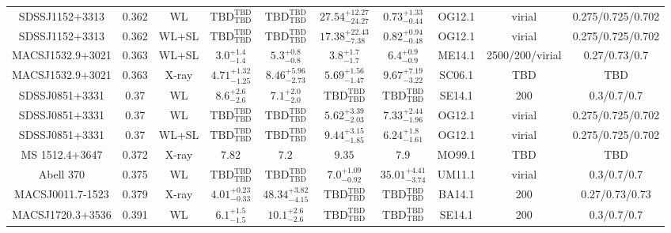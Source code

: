 \begin{table}
\begin{tabular}{cccccccccc}
SDSSJ1152+3313 & 0.362 & WL & ${\mathrm{TBD}}^{\mathrm{TBD}}_{\mathrm{TBD}}$ & ${\mathrm{TBD}}^{\mathrm{TBD}}_{\mathrm{TBD}}$ & ${27.54}^{+12.27}_{-24.27}$ & ${0.73}^{+1.33}_{-0.44}$ & OG12.1 & virial & 0.275/0.725/0.702 \\
SDSSJ1152+3313 & 0.362 & WL+SL & ${\mathrm{TBD}}^{\mathrm{TBD}}_{\mathrm{TBD}}$ & ${\mathrm{TBD}}^{\mathrm{TBD}}_{\mathrm{TBD}}$ & ${17.38}^{+22.43}_{-7.38}$ & ${0.82}^{+0.94}_{-0.48}$ & OG12.1 & virial & 0.275/0.725/0.702 \\
MACSJ1532.9+3021 & 0.363 & WL+SL & ${3.0}^{+1.4}_{-1.4}$ & ${5.3}^{+0.8}_{-0.8}$ & ${3.8}^{+1.7}_{-1.7}$ & ${6.4}^{+0.9}_{-0.9}$ & ME14.1 & 2500/200/virial & 0.27/0.73/0.7 \\
MACSJ1532.9+3021 & 0.363 & X-ray & ${4.71}^{+1.32}_{-1.25}$ & ${8.46}^{+5.96}_{-2.73}$ & ${5.69}^{+1.56}_{-1.47}$ & ${9.67}^{+7.19}_{-3.22}$ & SC06.1 & TBD & TBD \\
SDSSJ0851+3331 & 0.37 & WL & ${8.6}^{+2.6}_{-2.6}$ & ${7.1}^{+2.0}_{-2.0}$ & ${\mathrm{TBD}}^{\mathrm{TBD}}_{\mathrm{TBD}}$ & ${\mathrm{TBD}}^{\mathrm{TBD}}_{\mathrm{TBD}}$ & SE14.1 & 200 & 0.3/0.7/0.7 \\
SDSSJ0851+3331 & 0.37 & WL & ${\mathrm{TBD}}^{\mathrm{TBD}}_{\mathrm{TBD}}$ & ${\mathrm{TBD}}^{\mathrm{TBD}}_{\mathrm{TBD}}$ & ${5.62}^{+3.39}_{-2.03}$ & ${7.33}^{+2.44}_{-1.96}$ & OG12.1 & virial & 0.275/0.725/0.702 \\
SDSSJ0851+3331 & 0.37 & WL+SL & ${\mathrm{TBD}}^{\mathrm{TBD}}_{\mathrm{TBD}}$ & ${\mathrm{TBD}}^{\mathrm{TBD}}_{\mathrm{TBD}}$ & ${9.44}^{+3.15}_{-1.85}$ & ${6.24}^{+1.8}_{-1.61}$ & OG12.1 & virial & 0.275/0.725/0.702 \\
MS 1512.4+3647 & 0.372 & X-ray & ${7.82}^{}_{}$ & ${7.2}^{}_{}$ & ${9.35}^{}_{}$ & ${7.9}^{}_{}$ & MO99.1 & TBD & TBD \\
Abell 370 & 0.375 & WL & ${\mathrm{TBD}}^{\mathrm{TBD}}_{\mathrm{TBD}}$ & ${\mathrm{TBD}}^{\mathrm{TBD}}_{\mathrm{TBD}}$ & ${7.0}^{+1.09}_{-0.92}$ & ${35.01}^{+4.41}_{-3.74}$ & UM11.1 & virial & 0.3/0.7/0.7 \\
MACSJ0011.7-1523 & 0.379 & X-ray & ${4.01}^{+0.23}_{-0.33}$ & ${48.34}^{+3.82}_{-4.15}$ & ${\mathrm{TBD}}^{\mathrm{TBD}}_{\mathrm{TBD}}$ & ${\mathrm{TBD}}^{\mathrm{TBD}}_{\mathrm{TBD}}$ & BA14.1 & 200 & 0.27/0.73/0.73 \\
MACSJ1720.3+3536 & 0.391 & WL & ${6.1}^{+1.5}_{-1.5}$ & ${10.1}^{+2.6}_{-2.6}$ & ${\mathrm{TBD}}^{\mathrm{TBD}}_{\mathrm{TBD}}$ & ${\mathrm{TBD}}^{\mathrm{TBD}}_{\mathrm{TBD}}$ & SE14.1 & 200 & 0.3/0.7/0.7 \\

\end{tabular}
\end{table}
